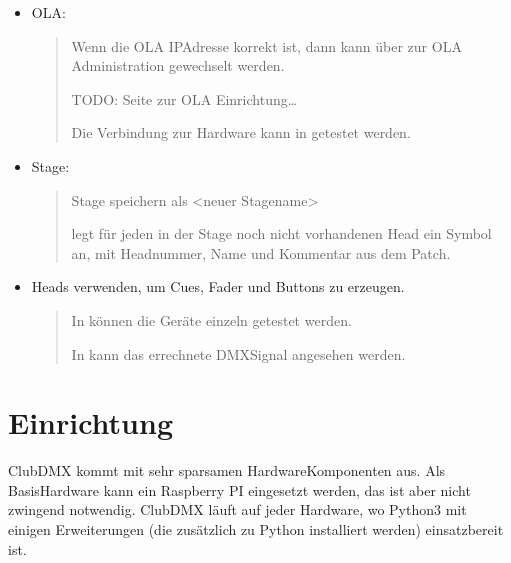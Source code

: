 \documentclass[letterpaper,10pt,ngerman]{sphinxmanual}
\begin{document}
\begin{itemize}
\item {} 
OLA:
\begin{quote}

Wenn die OLA IP\sphinxhyphen{}Adresse korrekt ist, dann kann über
zur OLA Administration gewechselt werden.

TODO: Seite zur OLA Einrichtung…

Die Verbindung zur Hardware kann in
 getestet werden.
\end{quote}

\item {} 
Stage:
\begin{quote}

Stage  speichern als \textless{}neuer Stagename\textgreater{}

 legt für jeden in der Stage noch nicht vorhandenen Head
ein Symbol an, mit Headnummer, Name und Kommentar aus dem Patch.
\end{quote}

\item {} 
Heads verwenden, um Cues, Fader und Buttons zu erzeugen.
\begin{quote}

In  können die Geräte einzeln getestet werden.

In  kann das errechnete DMX\sphinxhyphen{}Signal
angesehen werden.
\end{quote}

\end{itemize}


\chapter{Einrichtung}
\label{\detokenize{einrichten:einrichtung}}\label{\detokenize{einrichten:einrichten-label}}\label{\detokenize{einrichten::doc}}
ClubDMX kommt mit sehr sparsamen Hardware\sphinxhyphen{}Komponenten aus. Als
Basis\sphinxhyphen{}Hardware kann ein Raspberry PI eingesetzt werden, das ist aber
nicht zwingend notwendig. ClubDMX läuft auf jeder Hardware, wo
Python\sphinxhyphen{}3 mit einigen Erweiterungen (die zusätzlich zu Python
installiert werden) einsatzbereit ist.
\end{document}
